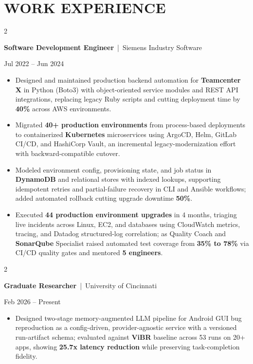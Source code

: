 \documentclass[10pt, letterpaper]{article}
\newenvironment{highlights}{
    \begin{itemize}[
        topsep=0.10 cm,
        parsep=0.06 cm,
        partopsep=0pt,
        itemsep=0.06 cm,
        leftmargin=12pt
    ]
}{
    \end{itemize}
}
\newenvironment{twocolentry}[2][]{
    \onecolentry
    \def\secondColumn{#2}
    \setcolumnwidth{\fill, 4.5 cm}
    \begin{paracol}{2}
}{
    \switchcolumn \raggedleft \secondColumn
    \end{paracol}
    \endonecolentry
}
\begin{document}
\section{WORK EXPERIENCE}
\begin{twocolentry}{Jul 2022 -- Jun 2024}
\textbf{Software Development Engineer} \,|\, Siemens Industry Software
\end{twocolentry}
\begin{highlights}
  \item Designed and maintained production backend automation for \textbf{Teamcenter X} in Python (Boto3) with object-oriented service modules and REST API integrations, replacing legacy Ruby scripts and cutting deployment time by \textbf{40\%} across AWS environments.
  \item Migrated \textbf{40+ production environments} from process-based deployments to containerized \textbf{Kubernetes} microservices using ArgoCD, Helm, GitLab CI/CD, and HashiCorp Vault, an incremental legacy-modernization effort with backward-compatible cutover.
  \item Modeled environment config, provisioning state, and job status in \textbf{DynamoDB} and relational stores with indexed lookups, supporting idempotent retries and partial-failure recovery in CLI and Ansible workflows; added automated rollback cutting upgrade downtime \textbf{50\%}.
  \item Executed \textbf{44 production environment upgrades} in 4 months, triaging live incidents across Linux, EC2, and databases using CloudWatch metrics, tracing, and Datadog structured-log correlation; as Quality Coach and \textbf{SonarQube} Specialist raised automated test coverage from \textbf{35\% to 78\%} via CI/CD quality gates and mentored \textbf{5 engineers}.
\end{highlights}

\vspace{0.10 cm}

\begin{twocolentry}{Feb 2026 -- Present}
\textbf{Graduate Researcher} \,|\, University of Cincinnati
\end{twocolentry}
\begin{highlights}
  \item Designed two-stage memory-augmented LLM pipeline for Android GUI bug reproduction as a config-driven, provider-agnostic service with a versioned run-artifact schema; evaluated against \textbf{ViBR} baseline across 53 runs on 20+ apps, showing \textbf{25.7x latency reduction} while preserving task-completion fidelity.
\end{highlights}
\end{document}
